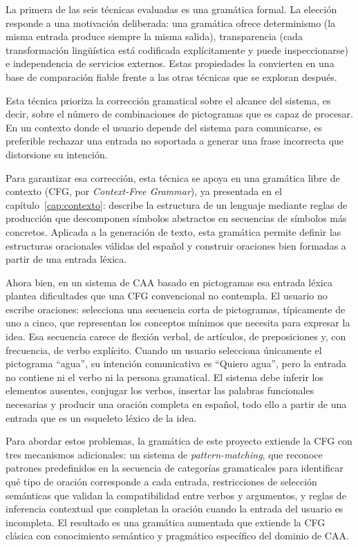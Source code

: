 La primera de las seis técnicas evaluadas es una gramática formal. La elección responde a una motivación deliberada: una gramática ofrece determinismo (la misma entrada produce siempre la misma salida), transparencia (cada transformación lingüística está codificada explícitamente y puede inspeccionarse) e independencia de servicios externos. Estas propiedades la convierten en una base de comparación fiable frente a las otras técnicas que se exploran después.

Esta técnica prioriza la corrección gramatical sobre el alcance del sistema, es decir, sobre el número de combinaciones de pictogramas que es capaz de procesar. En un contexto donde el usuario depende del sistema para comunicarse, es preferible rechazar una entrada no soportada a generar una frase incorrecta que distorsione su intención.

Para garantizar esa corrección, esta técnica se apoya en una gramática libre de contexto (CFG, por \textit{Context-Free Grammar}), ya presentada en el capítulo~\ref{cap:contexto}: describe la estructura de un lenguaje mediante reglas de producción que descomponen símbolos abstractos en secuencias de símbolos más concretos. Aplicada a la generación de texto, esta gramática permite definir las estructuras oracionales válidas del español y construir oraciones bien formadas a partir de una entrada léxica.

Ahora bien, en un sistema de CAA basado en pictogramas esa entrada léxica plantea dificultades que una CFG convencional no contempla. El usuario no escribe oraciones: selecciona una secuencia corta de pictogramas, típicamente de uno a cinco, que representan los conceptos mínimos que necesita para expresar la idea. Esa secuencia carece de flexión verbal, de artículos, de preposiciones y, con frecuencia, de verbo explícito. Cuando un usuario selecciona únicamente el pictograma ``agua'', su intención comunicativa es ``Quiero agua'', pero la entrada no contiene ni el verbo ni la persona gramatical. El sistema debe inferir los elementos ausentes, conjugar los verbos, insertar las palabras funcionales necesarias y producir una oración completa en español, todo ello a partir de una entrada que es un esqueleto léxico de la idea.

Para abordar estos problemas, la gramática de este proyecto extiende la CFG con tres mecanismos adicionales: un sistema de \textit{pattern-matching}, que reconoce patrones predefinidos en la secuencia de categorías gramaticales para identificar qué tipo de oración corresponde a cada entrada, restricciones de selección semánticas que validan la compatibilidad entre verbos y argumentos, y reglas de inferencia contextual que completan la oración cuando la entrada del usuario es incompleta. El resultado es una gramática aumentada que extiende la CFG clásica con conocimiento semántico y pragmático específico del dominio de CAA.

